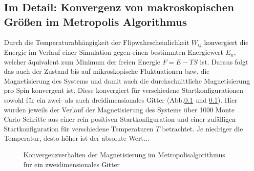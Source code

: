\subsection{Im Detail: Konvergenz von makroskopischen Größen im Metropolis Algorithmus}

Durch die Temperaturabhängigkeit der Flipwahrscheinlichkeit $W_{ij}$ konvergiert die Energie im Verlauf einer Simulation gegen einen bestimmten Energiewert $E_{n}$, welcher äquivalent zum Minimum der freien Energie $F=E-TS$ ist. Daraus folgt das auch der Zustand bis auf mikroskopische Fluktuationen bzw. die Magnetisierung des Systems und damit auch die durchschnittliche Magnetisierung pro Spin konvergent ist. Diese konvergiert für verschiedene Startkonfigurationen sowohl für ein zwei- als auch dreidimensionales Gitter (Abb.\ref{} und \ref{}). Hier wurden jeweils der Verlauf der Magnetisierung des Systems über 1000 Monte Carlo Schritte aus einer rein positiven Startkonfiguration und einer zufälligen Startkonfiguration für verschiedene Temperaturen $T$ betrachtet. Je niedriger die Temperatur, desto höher ist der absolute Wert...
\begin{figure}[H]
	\centering
	\caption{Konvergenzverhalten der Magnetisierung im Metropolisalgorithmus für ein zweidimensionales Gitter}
	\label{mp2dkonv}
\end{figure}
